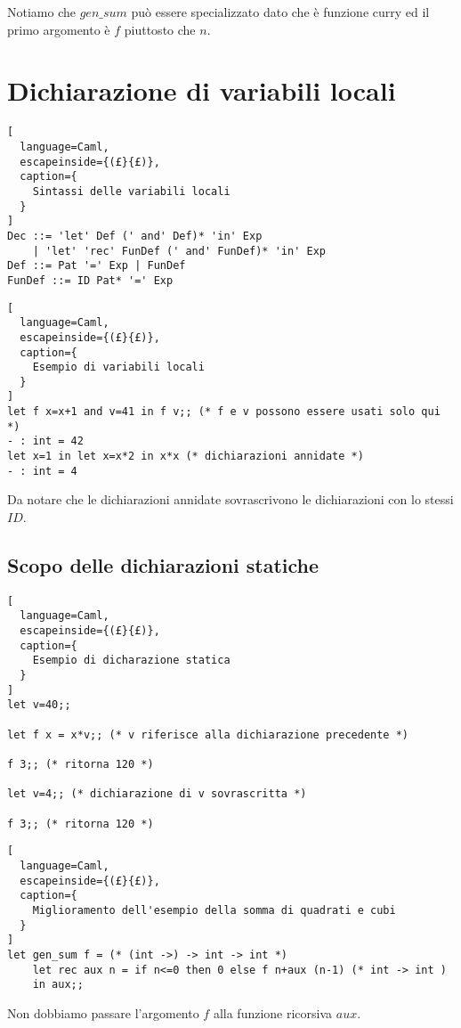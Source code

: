 Notiamo che $gen\_sum$ può essere specializzato dato che è funzione curry
ed il primo argomento è $f$ piuttosto che $n$.

\section{Dichiarazione di variabili locali}
\begin{lstlisting}[
  language=Caml,
  escapeinside={(£}{£)},
  caption={
    Sintassi delle variabili locali
  }
]
Dec ::= 'let' Def (' and' Def)* 'in' Exp
    | 'let' 'rec' FunDef (' and' FunDef)* 'in' Exp
Def ::= Pat '=' Exp | FunDef
FunDef ::= ID Pat* '=' Exp
\end{lstlisting}

\begin{lstlisting}[
  language=Caml,
  escapeinside={(£}{£)},
  caption={
    Esempio di variabili locali
  }
]
let f x=x+1 and v=41 in f v;; (* f e v possono essere usati solo qui *)
- : int = 42
let x=1 in let x=x*2 in x*x (* dichiarazioni annidate *)
- : int = 4
\end{lstlisting}

Da notare che le dichiarazioni annidate sovrascrivono le dichiarazioni con
lo stessi $ID$.

\subsection{Scopo delle dichiarazioni statiche}
\begin{lstlisting}[
  language=Caml,
  escapeinside={(£}{£)},
  caption={
    Esempio di dicharazione statica
  }
]
let v=40;;

let f x = x*v;; (* v riferisce alla dichiarazione precedente *)

f 3;; (* ritorna 120 *)

let v=4;; (* dichiarazione di v sovrascritta *)

f 3;; (* ritorna 120 *)
\end{lstlisting}

\begin{lstlisting}[
  language=Caml,
  escapeinside={(£}{£)},
  caption={
    Miglioramento dell'esempio della somma di quadrati e cubi
  }
]
let gen_sum f = (* (int ->) -> int -> int *)
    let rec aux n = if n<=0 then 0 else f n+aux (n-1) (* int -> int )
    in aux;;
\end{lstlisting}

Non dobbiamo passare l'argomento $f$ alla funzione ricorsiva $aux$.
